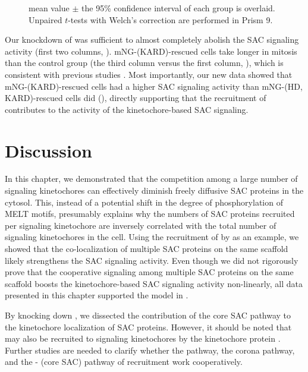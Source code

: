 \begin{figure}
mean value $\pm$ the 95\% confidence interval of each group is overlaid. Unpaired $t$-tests with Welch's correction are performed in Prism 9.
\end{figure}

Our knockdown of  was sufficient to almost completely abolish the SAC signaling activity (first two columns, ). mNG-(\textDelta{}KARD)-rescued cells take longer in mitosis than the control group (the third column versus the first column, ), which is consistent with previous studies \cite{PP2A-B56, BUBR1-L669A+I672A}. Most importantly, our new data showed that mNG-(\textDelta{}KARD)-rescued cells had a higher SAC signaling activity than mNG-(\textDelta{}HD, \textDelta{}KARD)-rescued cells did (), directly supporting that the recruitment of   contributes to the activity of the kinetochore-based SAC signaling.

\section{Discussion}
\label{Chapter3Discussions}

In this chapter, we demonstrated that the competition among a large number of signaling kinetochores can effectively diminish freely diffusive SAC proteins in the cytosol. This, instead of a potential shift in the degree of phosphorylation of MELT motifs, presumably explains why the numbers of SAC proteins recruited per signaling kinetochore are inversely correlated with the total number of signaling kinetochores in the cell. Using the recruitment of  by  as an example, we showed that the co-localization of multiple SAC proteins on the same  scaffold likely strengthens the SAC signaling activity. Even though we did not rigorously prove that the cooperative signaling among multiple SAC proteins on the same  scaffold boosts the kinetochore-based SAC signaling activity non-linearly, all data presented in this chapter supported the model in .

By knocking down , we dissected the contribution of the core SAC pathway to the kinetochore localization of SAC proteins. However, it should be noted that  may also be recruited to signaling kinetochores by the kinetochore protein  \cite{MIS12-CEP57-MAD1-MAD2}. Further studies are needed to clarify whether the  pathway, the corona pathway, and the - (core SAC) pathway of  recruitment work cooperatively.


